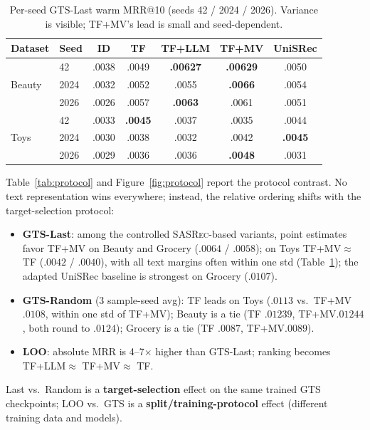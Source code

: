 \documentclass[sigconf,natbib=true,anonymous]{acmart}
\newcommand{\tfllm}{\textsc{TF+LLM}\xspace}
\newcommand{\tfmv}{\textsc{TF+MV}\xspace}
\newcommand{\base}{\textsc{SASRec}\xspace}
\begin{document}
\begin{table}[t]
\centering
\caption{%
Per-seed GTS-Last warm MRR@10 (seeds 42 / 2024 / 2026).
Variance is visible; \tfmv's lead is small and seed-dependent.%
}
\label{tab:perseed}
\small
\setlength{\tabcolsep}{3pt}
\begin{tabular}{@{}llccccc@{}}
\toprule
Dataset & Seed & ID & TF & TF+LLM & TF+MV & UniSRec \\
\midrule
\multirow{3}{*}{Beauty}
 & 42    & .0038 & .0049 & \textbf{.00627} & \textbf{.00629} & .0050 \\
 & 2024  & .0032 & .0052 & .0055 & \textbf{.0066} & .0054 \\
 & 2026  & .0026 & .0057 & \textbf{.0063} & .0061 & .0051 \\
\midrule
\multirow{3}{*}{Toys}
 & 42    & .0033 & \textbf{.0045} & .0037 & .0035 & .0044 \\
 & 2024  & .0030 & .0038 & .0032 & .0042 & \textbf{.0045} \\
 & 2026  & .0029 & .0036 & .0036 & \textbf{.0048} & .0031 \\
\bottomrule
\end{tabular}
\end{table}

Table~\ref{tab:protocol} and Figure~\ref{fig:protocol} report the protocol contrast.
No text representation wins everywhere; instead, the relative ordering shifts with the target-selection protocol:

\begin{itemize}[leftmargin=*,itemsep=1pt]
\item \textbf{GTS-Last}: among the controlled \base-based variants, point estimates favor \tfmv on Beauty and Grocery ($.0064$ / $.0058$); on Toys TF+MV${}\approx{}$TF ($.0042$ / $.0040$), with all text margins often within one std (Table~\ref{tab:perseed}); the adapted UniSRec baseline is strongest on Grocery ($.0107$).
\item \textbf{GTS-Random} (3 sample-seed avg): TF leads on Toys ($.0113$ vs.\ \tfmv $.0108$, within one std of \tfmv); Beauty is a tie (TF $.01239$, \tfmv $.01244$, both round to $.0124$); Grocery is a tie (TF $.0087$, \tfmv $.0089$).
\item \textbf{LOO}: absolute MRR is 4--7$\times$ higher than GTS-Last; ranking becomes \tfllm $\approx$ \tfmv $\approx$ TF.
\end{itemize}
Last vs.\ Random is a \textbf{target-selection} effect on the same trained GTS checkpoints; LOO vs.\ GTS is a \textbf{split/training-protocol} effect (different training data and models).
\end{document}

